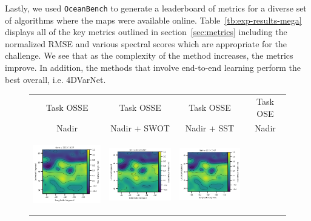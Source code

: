 Lastly, we used \texttt{OceanBench} to generate a leaderboard of metrics for a diverse set of algorithms where the maps were available online.
Table~\ref{tb:exp-results-mega} displays all of the key metrics outlined in section~\ref{sec:metrics} including the normalized RMSE and various spectral scores which are appropriate for the challenge.
We see that as the complexity of the method increases, the metrics improve. 
In addition, the methods that involve end-to-end learning perform the best overall, i.e. 4DVarNet.

\begin{figure}[ht!]
\small
\begin{center}
\setlength{\tabcolsep}{1pt}
\begin{tabular}{cccc}
\hspace{3mm} Task OSSE & 
\hspace{3mm} Task OSSE & 
\hspace{2mm} Task OSSE & 
Task OSE \\
\hspace{3mm}  Nadir & 
\hspace{3mm} Nadir + SWOT & 
\hspace{2mm} Nadir + SST & 
Nadir \\
\includegraphics[trim={0 13mm 22mm 0},clip, width=3.60cm,height=3.2cm]{00_Oceanbench/content/figures/fourdvarnet_figs/osse_gf_nadir_ssh.png} &
\includegraphics[trim={13mm 13mm 22mm 0},clip, width=3.2cm,height=3.2cm]{00_Oceanbench/content/figures/fourdvarnet_figs/osse_gf_nadirswot_ssh.png} &
\includegraphics[trim={13mm 13mm 22mm 0},clip, width=3.2cm,height=3.2cm]{00_Oceanbench/content/figures/fourdvarnet_figs/osse_gf_nadir_sst_ssh.png} &

\end{tabular}
\end{center}
\end{figure}
